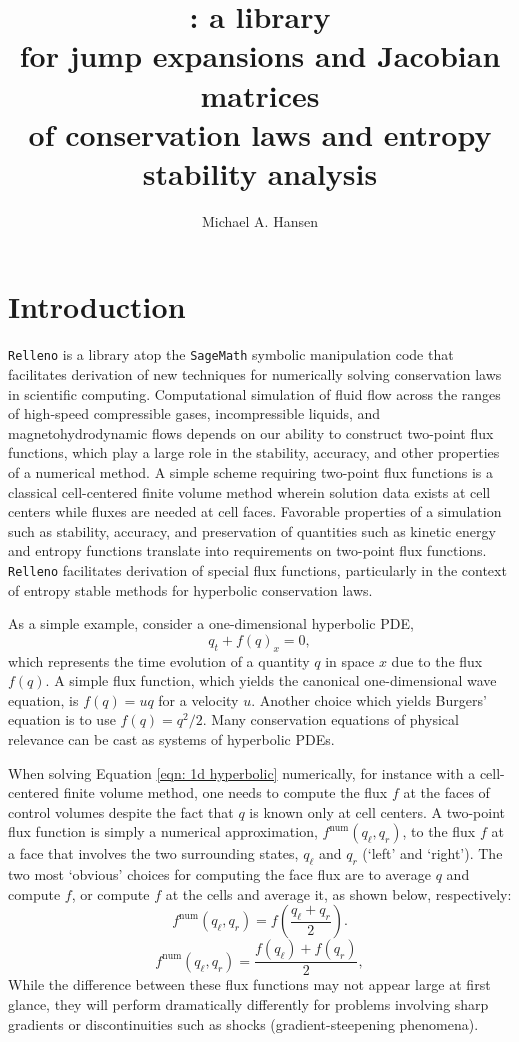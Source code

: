 \documentclass[10pt]{article}
\title{\Relleno{}: a \sage{} library \\ for jump expansions and Jacobian matrices \\ of conservation laws and entropy stability analysis}
\author{Michael A. Hansen}
\newcommand{\num}{\mathrm{num}}
\newcommand{\Relleno}{\texttt{Relleno}}
\newcommand{\sage}{\texttt{SageMath}}
\begin{document}
\maketitle

\section{Introduction}
\Relleno{} is a library atop the \sage{} symbolic manipulation code that facilitates derivation of new techniques for numerically solving conservation laws in scientific computing.
Computational simulation of fluid flow across the ranges of high-speed compressible gases, incompressible liquids, and magnetohydrodynamic flows depends on our ability to construct two-point flux functions, which play a large role in the stability, accuracy, and other properties of a numerical method.
A simple scheme requiring two-point flux functions is a classical cell-centered finite volume method wherein solution data exists at cell centers while fluxes are needed at cell faces.
Favorable properties of a simulation such as stability, accuracy, and preservation of quantities such as kinetic energy and entropy functions translate into requirements on two-point flux functions.
\Relleno{} facilitates derivation of special flux functions, particularly in the context of entropy stable methods for hyperbolic conservation laws.

As a simple example, consider a one-dimensional hyperbolic PDE,
\begin{equation}
	q_t + f(q)_x = 0,
	\label{eqn: 1d hyperbolic}
\end{equation}
which represents the time evolution of a quantity $q$ in space $x$ due to the flux $f(q)$.
A simple flux function, which yields the canonical one-dimensional wave equation, is $f(q)=uq$ for a velocity $u$.
Another choice which yields Burgers' equation is to use $f(q)=q^2/2$.
Many conservation equations of physical relevance can be cast as systems of hyperbolic PDEs.

When solving Equation \eqref{eqn: 1d hyperbolic} numerically, for instance with a cell-centered finite volume method, one needs to compute the flux $f$ at the faces of control volumes despite the fact that $q$ is known only at cell centers.
A two-point flux function is simply a numerical approximation, $f^\num(q_\ell,q_r)$, to the flux $f$ at a face that involves the two surrounding states, $q_\ell$ and $q_r$ (`left' and `right').
The two most `obvious' choices for computing the face flux are to average $q$ and compute $f$, or compute $f$ at the cells and average it, as shown below, respectively:
\begin{equation}
	f^\num(q_\ell,q_r) = f\left(\frac{q_\ell+q_r}{2}\right).
\end{equation}
\begin{equation}
	f^\num(q_\ell,q_r) = \frac{f(q_\ell)+f(q_r)}{2},
\end{equation}
While the difference between these flux functions may not appear large at first glance, they will perform dramatically differently for problems involving sharp gradients or discontinuities such as shocks (gradient-steepening phenomena).
\end{document}
